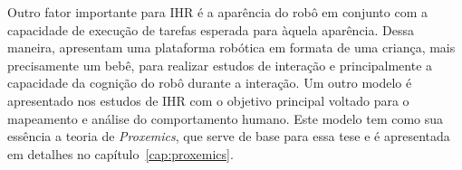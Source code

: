 Outro fator importante para IHR é a aparência do robô em conjunto com a capacidade de execução de tarefas esperada para àquela aparência. Dessa maneira,  apresentam uma plataforma robótica em formata de uma criança, mais precisamente um bebê, para realizar estudos de interação e principalmente a capacidade da cognição do robô durante a interação. Um outro modelo é apresentado nos estudos de IHR com o objetivo principal voltado para o mapeamento e análise do comportamento humano. Este modelo tem como sua essência a teoria de \emph{Proxemics}, que serve de base para essa tese e é apresentada em detalhes no capítulo~\ref{cap:proxemics}.
